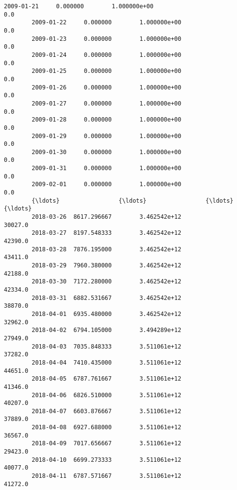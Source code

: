 \documentclass[11pt]{article}
\begin{document}
\begin{Verbatim}[commandchars=\\\{\}]
        2009-01-21     0.000000        1.000000e+00                              0.0   
        2009-01-22     0.000000        1.000000e+00                              0.0   
        2009-01-23     0.000000        1.000000e+00                              0.0   
        2009-01-24     0.000000        1.000000e+00                              0.0   
        2009-01-25     0.000000        1.000000e+00                              0.0   
        2009-01-26     0.000000        1.000000e+00                              0.0   
        2009-01-27     0.000000        1.000000e+00                              0.0   
        2009-01-28     0.000000        1.000000e+00                              0.0   
        2009-01-29     0.000000        1.000000e+00                              0.0   
        2009-01-30     0.000000        1.000000e+00                              0.0   
        2009-01-31     0.000000        1.000000e+00                              0.0   
        2009-02-01     0.000000        1.000000e+00                              0.0   
        {\ldots}                 {\ldots}                 {\ldots}                              {\ldots}   
        2018-03-26  8617.296667        3.462542e+12                          30027.0   
        2018-03-27  8197.548333        3.462542e+12                          42390.0   
        2018-03-28  7876.195000        3.462542e+12                          43411.0   
        2018-03-29  7960.380000        3.462542e+12                          42188.0   
        2018-03-30  7172.280000        3.462542e+12                          42334.0   
        2018-03-31  6882.531667        3.462542e+12                          38870.0   
        2018-04-01  6935.480000        3.462542e+12                          32962.0   
        2018-04-02  6794.105000        3.494289e+12                          27949.0   
        2018-04-03  7035.848333        3.511061e+12                          37282.0   
        2018-04-04  7410.435000        3.511061e+12                          44651.0   
        2018-04-05  6787.761667        3.511061e+12                          41346.0   
        2018-04-06  6826.510000        3.511061e+12                          40207.0   
        2018-04-07  6603.876667        3.511061e+12                          37889.0   
        2018-04-08  6927.688000        3.511061e+12                          36567.0   
        2018-04-09  7017.656667        3.511061e+12                          29423.0   
        2018-04-10  6699.273333        3.511061e+12                          40077.0   
        2018-04-11  6787.571667        3.511061e+12                          41272.0   

\end{Verbatim}
\end{document}
